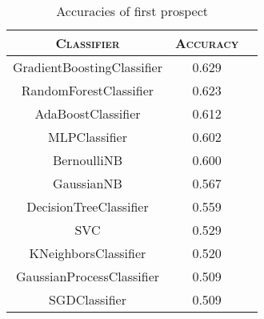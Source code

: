 \documentclass[12pt]{article}
\begin{document}
\begin{table}[ht]
    \centering
    \begin{tabular}{ccc}
        \toprule
        \textsc{Classifier}        & \textsc{Accuracy} \\ \midrule
        GradientBoostingClassifier & 0.629             \\
        RandomForestClassifier     & 0.623             \\
        AdaBoostClassifier         & 0.612             \\
        MLPClassifier              & 0.602             \\
        BernoulliNB                & 0.600             \\
        GaussianNB                 & 0.567             \\
        DecisionTreeClassifier     & 0.559             \\
        SVC                        & 0.529             \\
        KNeighborsClassifier       & 0.520             \\
        GaussianProcessClassifier  & 0.509             \\
        SGDClassifier              & 0.509             \\ \bottomrule
    \end{tabular}
    \caption{Accuracies of first prospect}
    \label{table: all algorithms and accuracy}
\end{table}
\end{document}
